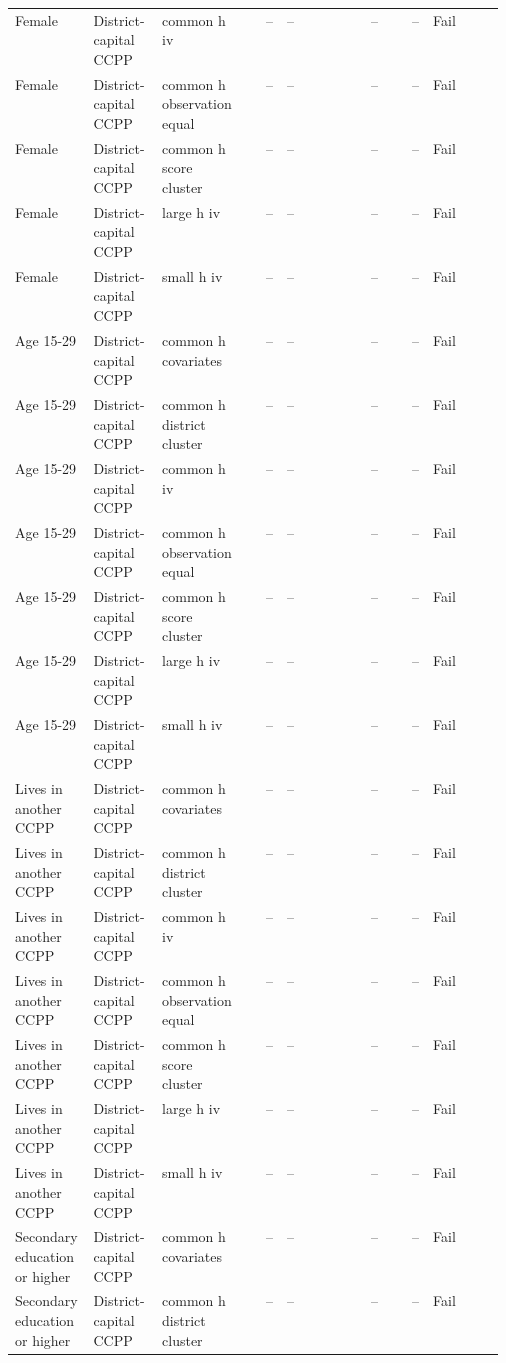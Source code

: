 \begin{longtable}{@{}p{0.16\linewidth}p{0.14\linewidth}p{0.14\linewidth}rp{0.13\linewidth}rrl@{}}
Female & District-capital CCPP & common h iv & -- & -- & -- & -- & Fail \\
Female & District-capital CCPP & common h observation equal & -- & -- & -- & -- & Fail \\
Female & District-capital CCPP & common h score cluster & -- & -- & -- & -- & Fail \\
Female & District-capital CCPP & large h iv & -- & -- & -- & -- & Fail \\
Female & District-capital CCPP & small h iv & -- & -- & -- & -- & Fail \\
Age 15-29 & District-capital CCPP & common h covariates & -- & -- & -- & -- & Fail \\
Age 15-29 & District-capital CCPP & common h district cluster & -- & -- & -- & -- & Fail \\
Age 15-29 & District-capital CCPP & common h iv & -- & -- & -- & -- & Fail \\
Age 15-29 & District-capital CCPP & common h observation equal & -- & -- & -- & -- & Fail \\
Age 15-29 & District-capital CCPP & common h score cluster & -- & -- & -- & -- & Fail \\
Age 15-29 & District-capital CCPP & large h iv & -- & -- & -- & -- & Fail \\
Age 15-29 & District-capital CCPP & small h iv & -- & -- & -- & -- & Fail \\
Lives in another CCPP & District-capital CCPP & common h covariates & -- & -- & -- & -- & Fail \\
Lives in another CCPP & District-capital CCPP & common h district cluster & -- & -- & -- & -- & Fail \\
Lives in another CCPP & District-capital CCPP & common h iv & -- & -- & -- & -- & Fail \\
Lives in another CCPP & District-capital CCPP & common h observation equal & -- & -- & -- & -- & Fail \\
Lives in another CCPP & District-capital CCPP & common h score cluster & -- & -- & -- & -- & Fail \\
Lives in another CCPP & District-capital CCPP & large h iv & -- & -- & -- & -- & Fail \\
Lives in another CCPP & District-capital CCPP & small h iv & -- & -- & -- & -- & Fail \\
Secondary education or higher & District-capital CCPP & common h covariates & -- & -- & -- & -- & Fail \\
Secondary education or higher & District-capital CCPP & common h district cluster & -- & -- & -- & -- & Fail \\

\end{longtable}
